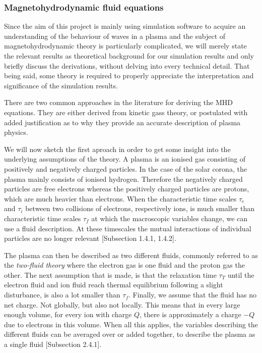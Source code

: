 \subsubsection{Magnetohydrodynamic fluid equations}
Since the aim of this project is mainly using simulation software to acquire an understanding of the behaviour of waves in a plasma and the subject of magnetohydrodynamic theory is particularly complicated,
we will merely state the relevant results as theoretical background for our simulation results and only briefly discuss the derivations, without delving into every technical detail.
That being said, some theory is required to properly appreciate the interpretation and significance of the simulation results.

There are two common approaches in the literature for deriving the MHD equations. They are either derived from kinetic gass theory, or postulated with added justification as to why they provide an accurate description of plasma physics.

We will now sketch the first aproach in order to get some insight into the underlying assumptions of the theory.
A plasma is an ionised gas consisting of positively and negatively charged particles. In the case of the solar corona, the plasma mainly consists of ionised hydrogen.
Therefore the negatively charged particles are free electrons whereas the positively charged particles are protons, which are much heavier than electrons.
When the characteristic time scales $\tau_e$ and $\tau_i$ between two collisions of electrons, respectively ions, is much smaller than characteristic time scales $\tau_f$ at which the macroscopic variables change, we can use a fluid description. 
At these timescales the mutual interactions of individual particles are no longer relevant \cite{notes-principles-MHD}[Subsection 1.4.1, 1.4.2].

The plasma can then be described as two different fluids, commonly referred to as the \emph{two-fluid theory} where the electron gas is one fluid and the proton gas the other. 
The next assumption that is made, is that the relaxation time $\tau_T$ until the electron fluid and ion fluid reach thermal equilibrium following a slight disturbance, is also a lot smaller than $\tau_f$.
Finally, we assume that the fluid has no net charge. Not globally, but also not locally. 
This means that in every large enough volume, for every ion with charge $Q$, there is approximately a charge $-Q$ due to electrons in this volume. When all this applies, the variables describing the different fluids can be averaged over or added together, to describe the plasma as a single fluid \cite{notes-principles-MHD}[Subsection 2.4.1].

